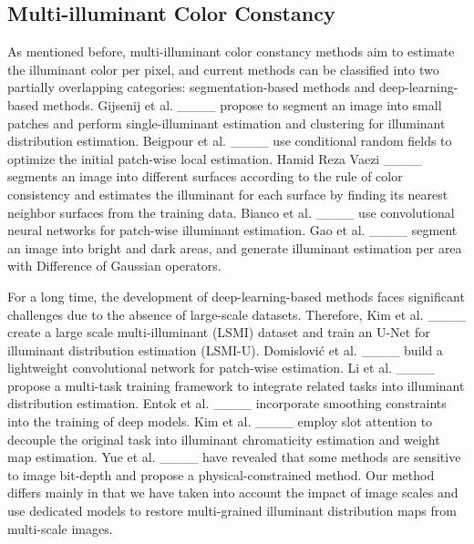\subsection{Multi-illuminant Color Constancy}
\label{sec2.2:Multi-illuminant Color Constancy}
As mentioned before, multi-illuminant color constancy methods aim to estimate the illuminant color per pixel, and current methods can be classified into two partially overlapping categories: segmentation-based methods and deep-learning-based methods. Gijsenij et al. ____ propose to segment an image into small patches and perform single-illuminant estimation and clustering for illuminant distribution estimation. Beigpour et al. ____ use conditional random fields to optimize the initial patch-wise local estimation. Hamid Reza Vaezi ____ segments an image into different surfaces according to the rule of color consistency and estimates the illuminant for each surface by finding its nearest neighbor surfaces from the training data. Bianco et al. ____ use convolutional neural networks for patch-wise illuminant estimation. Gao et al. ____ segment an image into bright and dark areas, and generate illuminant estimation per area with Difference of Gaussian operators.

For a long time, the development of deep-learning-based methods faces significant challenges due to the absence of large-scale datasets. Therefore, Kim et al. ____ create a large scale multi-illuminant (LSMI) dataset and train an U-Net for illuminant distribution estimation (LSMI-U). Domislović et al. ____ build a lightweight convolutional network for patch-wise estimation. Li et al. ____ propose a multi-task training framework to integrate related tasks into illuminant distribution estimation. Entok et al. ____ incorporate smoothing constraints into the training of deep models. Kim et al. ____ employ slot attention to decouple the original task into illuminant chromaticity estimation and weight map estimation. Yue et al. ____ have revealed that some methods are sensitive to image bit-depth and propose a physical-constrained method. Our method differs mainly in that we have taken into account the impact of image scales and use dedicated models to restore multi-grained illuminant distribution maps from multi-scale images.